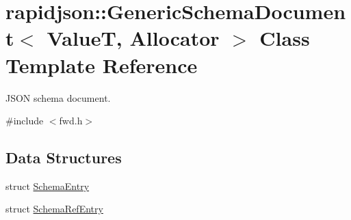 \hypertarget{classrapidjson_1_1_generic_schema_document}{}\section{rapidjson\+::Generic\+Schema\+Document$<$ ValueT, Allocator $>$ Class Template Reference}
\label{classrapidjson_1_1_generic_schema_document}


J\+S\+ON schema document.  




{\ttfamily \#include $<$fwd.\+h$>$}

\subsection*{Data Structures}
\begin{DoxyCompactItemize}
\item 
struct \mbox{\hyperlink{structrapidjson_1_1_generic_schema_document_1_1_schema_entry}{Schema\+Entry}}
\item 
struct \mbox{\hyperlink{structrapidjson_1_1_generic_schema_document_1_1_schema_ref_entry}{Schema\+Ref\+Entry}}
\end{DoxyCompactItemize}
